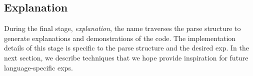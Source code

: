 \subsection{Explanation}

During the final stage, \emph{explanation}, the \Gls{name} traverses the parse structure to generate explanations and demonstrations of the code.
The implementation details of this stage is specific to the parse structure and the desired \gls{exp}.
In the next section, we describe techniques that we hope provide inspiration for future language-specific \glspl{exp}.
